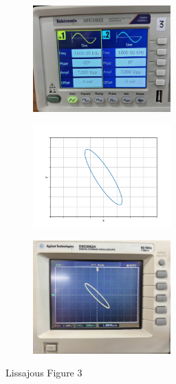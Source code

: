 \documentclass[a4paper,12pt]{article}
\begin{document}
\begin{figure}[h!]
	\begin{subfigure}[b]{10pt}
		\includegraphics[width = 150pt]{figs/fig3.jpeg}
	\end{subfigure}
	\hspace{120pt}
	\begin{subfigure}[b]{10pt}
		\includegraphics[width = 150pt]{figs/fig3.png}
	\end{subfigure}
	\hspace{130pt}
	\begin{subfigure}[b]{10pt}
		\includegraphics[width = 150pt]{figs/fig3_1.jpeg}
	\end{subfigure}
	\caption{Lissajous Figure 3}
\end{figure}
\end{document}
